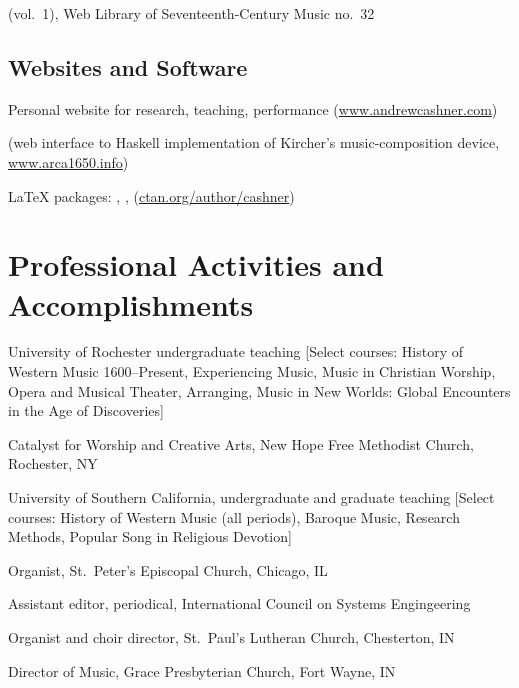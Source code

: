 \documentclass{neh-resume}
\begin{document}
{
(vol.~1), Web Library of Seventeenth-Century Music no.~32}

\subsection{Websites and Software}

{Personal website for research, teaching, performance (\url{www.andrewcashner.com})}

{ (web interface to Haskell implementation of Kircher's
music-composition device, \url{www.arca1650.info})}

{\LaTeX{} packages: , ,
 (\url{ctan.org/author/cashner})}

\section{Professional Activities and Accomplishments}
{University of Rochester undergraduate teaching}
[Select courses: 
History of Western Music 1600--Present, 
Experiencing Music, 
Music in Christian Worship, 
Opera and Musical Theater, 
Arranging, 
Music in New Worlds: Global Encounters in the Age of Discoveries]

{Catalyst for Worship and Creative Arts,
New Hope Free Methodist Church, Rochester, NY}

{University of Southern California, undergraduate and graduate teaching}
[Select courses:
History of Western  Music (all periods), Baroque Music, Research Methods,
Popular Song in Religious Devotion]

{Organist, St.\ Peter's Episcopal Church, Chicago, IL}

{Assistant editor,  periodical, International Council on
Systems Engingeering}
    
{Organist and choir director, St.\ Paul's Lutheran Church, Chesterton, IN}
    
{Director of Music, Grace Presbyterian Church, Fort Wayne, IN}
\end{document}
